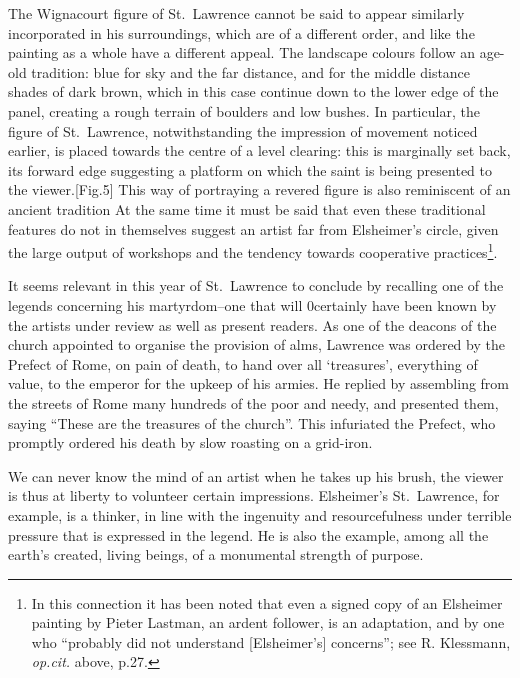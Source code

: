 \documentclass[a4paper,12pt]{article}
\begin{document}
The Wignacourt figure of St.~Lawrence cannot be said to appear
similarly incorporated in his surroundings, which are of a different
order, and like the painting as a whole have a different appeal.  The
landscape colours follow an age-old tradition: blue for sky and the
far distance, and for the middle distance shades of dark brown, which
in this case continue down to the lower edge of the panel, creating a
rough terrain of boulders and low bushes.  In particular, the figure
of St.~Lawrence, notwithstanding the impression of movement noticed
earlier, is placed towards the centre of a level clearing: this is
marginally set back, its forward edge suggesting a platform on which
the saint is being presented to the viewer.[Fig.5] 
This way of
portraying a revered figure is also reminiscent of an ancient
tradition At the same time it must be said that even these traditional
features do not in themselves suggest an artist far from Elsheimer's
circle, given the large output of workshops and the tendency towards
cooperative practices\footnote{In this connection it has been noted
  that even a signed copy of an Elsheimer painting by Pieter Lastman,
  an ardent follower, is an adaptation, and by one who “probably did
  not understand [Elsheimer's] concerns”; see R. Klessmann,
  \textit{op.cit.} above, p.27.}.

It seems relevant in this year of St.~Lawrence to conclude by
recalling one of the legends concerning his martyrdom--one that will
0certainly have been known by the artists under review as well as
present readers.  As one of the deacons of the church appointed to
organise the provision of alms, Lawrence was ordered by the Prefect of
Rome, on pain of death, to hand over all `treasures', everything of
value, to the emperor for the upkeep of his armies.  He replied by
assembling from the streets of Rome many hundreds of the poor and
needy, and presented them, saying ``These are the treasures of the
church''.  This infuriated the Prefect, who promptly ordered his death
by slow roasting on a grid-iron.

We can never know the mind of an artist when he takes up his brush,
the viewer is thus at liberty to volunteer certain impressions.
Elsheimer's St.~Lawrence, for example, is a thinker, in line with the
ingenuity and resourcefulness under terrible pressure that is
expressed in the legend.  He is also the example, among all the
earth's created, living beings, of a monumental strength of purpose.
\end{document}
